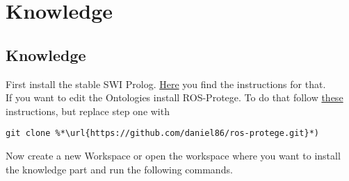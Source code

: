 \documentclass[main.tex]{subfiles}
\begin{document}
\section{Knowledge}
\subsection{Knowledge}
First install the stable SWI Prolog. \href{https://www.swi-prolog.org/build/PPA.html}{Here} you find the instructions for that.\\
If you want to edit the Ontologies install ROS-Protege. To do that follow \href{https://github.com/protegeproject/protege/wiki/Building-from-Source}{these} instructions, but replace step one with
\begin{lstlisting}
git clone %*\url{https://github.com/daniel86/ros-protege.git}*)
\end{lstlisting}

Now create a new Workspace or open the workspace where you want to install the knowledge part and run the following commands.\\
\begin{mdframed}[backgroundcolor=mygray, rightline=false]

\end{mdframed}
\end{document}
